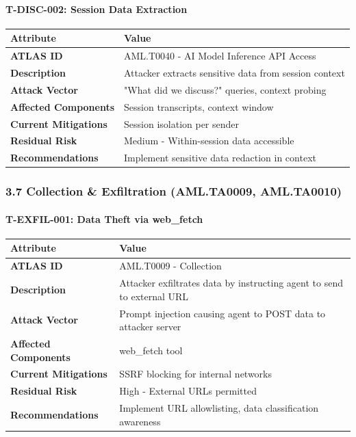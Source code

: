 \paragraph{T-DISC-002: Session Data Extraction}



\begin{table}[h]
\centering
\small
\begin{tabular}{|l|l|}
\hline
Attribute & Value \\
\hline
\textbf{ATLAS ID} & AML.T0040 - AI Model Inference API Access \\
\hline
\textbf{Description} & Attacker extracts sensitive data from session context \\
\hline
\textbf{Attack Vector} & "What did we discuss?" queries, context probing \\
\hline
\textbf{Affected Components} & Session transcripts, context window \\
\hline
\textbf{Current Mitigations} & Session isolation per sender \\
\hline
\textbf{Residual Risk} & Medium - Within-session data accessible \\
\hline
\textbf{Recommendations} & Implement sensitive data redaction in context \\
\hline
\end{tabular}
\end{table}



\hrulefill


\subsubsection{3.7 Collection \& Exfiltration (AML.TA0009, AML.TA0010)}


\paragraph{T-EXFIL-001: Data Theft via web\_fetch}



\begin{table}[h]
\centering
\small
\begin{tabular}{|l|l|}
\hline
Attribute & Value \\
\hline
\textbf{ATLAS ID} & AML.T0009 - Collection \\
\hline
\textbf{Description} & Attacker exfiltrates data by instructing agent to send to external URL \\
\hline
\textbf{Attack Vector} & Prompt injection causing agent to POST data to attacker server \\
\hline
\textbf{Affected Components} & web\_fetch tool \\
\hline
\textbf{Current Mitigations} & SSRF blocking for internal networks \\
\hline
\textbf{Residual Risk} & High - External URLs permitted \\
\hline
\textbf{Recommendations} & Implement URL allowlisting, data classification awareness \\
\hline
\end{tabular}
\end{table}



